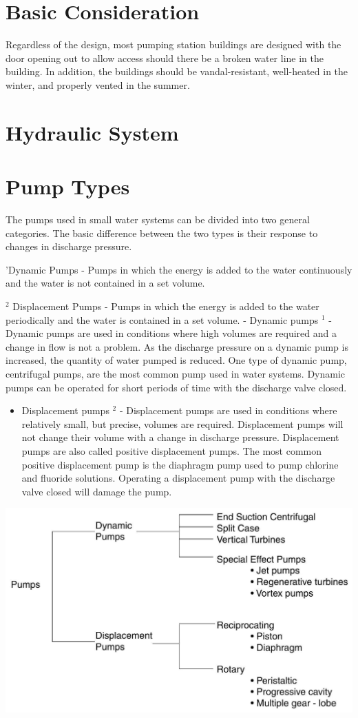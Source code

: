 \documentclass[10pt]{article}
\begin{document}
\section{Basic Consideration}
Regardless of the design, most pumping station buildings are designed with the door opening out to allow access should there be a broken water line in the building. In addition, the buildings should be vandal-resistant, well-heated in the winter, and properly vented in the summer.

\section{Hydraulic System}
\section{Pump Types}
The pumps used in small water systems can be divided into two general categories. The basic difference between the two types is their response to changes in discharge pressure.

'Dynamic Pumps - Pumps in which the energy is added to the water continuously and the water is not contained in a set volume.

${ }^{2}$ Displacement Pumps - Pumps in which the energy is added to the water periodically and the water is contained in a set volume. - Dynamic pumps ${ }^{1}$ - Dynamic pumps are used in conditions where high volumes are required and a change in flow is not a problem. As the discharge pressure on a dynamic pump is increased, the quantity of water pumped is reduced. One type of dynamic pump, centrifugal pumps, are the most common pump used in water systems. Dynamic pumps can be operated for short periods of time with the discharge valve closed.

\begin{itemize}
  \item Displacement pumps ${ }^{2}$ - Displacement pumps are used in conditions where relatively small, but precise, volumes are required. Displacement pumps will not change their volume with a change in discharge pressure. Displacement pumps are also called positive displacement pumps. The most common positive displacement pump is the diaphragm pump used to pump chlorine and fluoride solutions. Operating a displacement pump with the discharge valve closed will damage the pump.
\end{itemize}
\includegraphics[max width=\textwidth]{PumpTypes}
\end{document}
